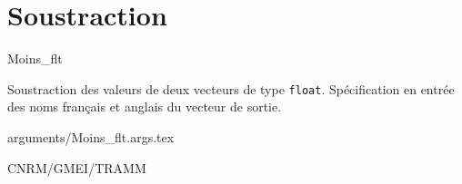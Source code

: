 %
\section{Soustraction}

 {\sf Moins\_flt}

\bigskip
{}
Soustraction des valeurs de deux vecteurs de type {\tt float}.
Sp\'ecification en entr\'ee des  noms fran\c cais et anglais du
vecteur de sortie.

\bigskip
 {arguments/Moins_flt.args.tex}


\bigskip
{}


\bigskip
{}
CNRM/GMEI/TRAMM

\bigskip
{}
